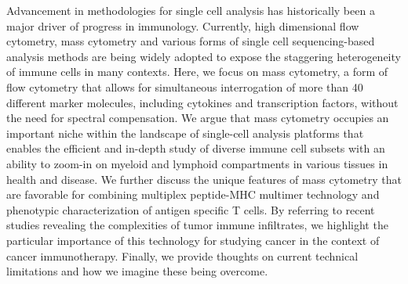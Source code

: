 \citep{simoniMassCytometryPowerful2018}
Advancement in methodologies for single cell analysis has historically been a
major driver of progress in immunology. Currently, high dimensional flow
cytometry, mass cytometry and various forms of single cell sequencing-based
analysis methods are being widely adopted to expose the staggering
heterogeneity of immune cells in many contexts. Here, we focus on mass
cytometry, a form of flow cytometry that allows for simultaneous interrogation
of more than 40 different marker molecules, including cytokines and
transcription factors, without the need for spectral compensation. We argue
that mass cytometry occupies an important niche within the landscape of
single-cell analysis platforms that enables the efficient and in-depth study of
diverse immune cell subsets with an ability to zoom-in on myeloid and lymphoid
compartments in various tissues in health and disease. We further discuss the
unique features of mass cytometry that are favorable for combining multiplex
peptide-MHC multimer technology and phenotypic characterization of antigen
specific T cells. By referring to recent studies revealing the complexities of
tumor immune infiltrates, we highlight the particular importance of this
technology for studying cancer in the context of cancer immunotherapy. Finally,
we provide thoughts on current technical limitations and how we imagine these
being overcome.

\printbibliography


